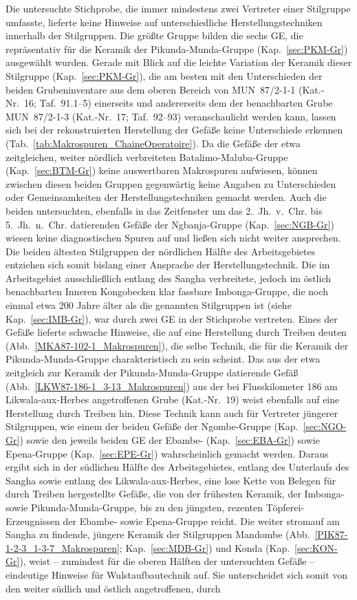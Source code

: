 Die untersuchte Stichprobe, die immer mindestens zwei Vertreter einer Stilgruppe umfasste, lieferte keine Hinweise auf unterschiedliche Herstellungstechniken innerhalb der Stilgruppen. Die größte Gruppe bilden die sechs GE, die repräsentativ für die Keramik der Pikunda-Munda-Gruppe (Kap.~\ref{sec:PKM-Gr}) ausgewählt wurden. Gerade mit Blick auf die leichte Variation der Keramik dieser Stilgruppe (Kap.~\ref{sec:PKM-Gr}), die am besten mit den Unterschieden der beiden Grubeninventare aus dem oberen Bereich von MUN~87/2-1-1 (Kat.-Nr.~16; Taf.~91.1--5) einerseits und andererseits dem der benachbarten Grube MUN~87/2-1-3 (Kat.-Nr.~17; Taf.~92--93) veranschaulicht werden kann, lassen sich bei der rekonstruierten Herstellung der Gefäße keine Unterschiede erkennen (Tab.~\ref{tab:Makrospuren_ChaineOperatoire}). Da die Gefäße der etwa zeitgleichen, weiter nördlich verbreiteten Batalimo-Maluba-Gruppe (Kap.~\ref{sec:BTM-Gr}) keine auswertbaren Makrospuren aufwiesen, können zwischen diesen beiden Gruppen gegenwärtig keine Angaben zu Unterschieden oder Gemeinsamkeiten der Herstellungstechniken gemacht werden. Auch die beiden untersuchten, ebenfalls in das Zeitfenster um das 2.~Jh.~v.~Chr. bis 5.~Jh.~n.~Chr. datierenden Gefäße der Ngbanja-Gruppe (Kap.~\ref{sec:NGB-Gr}) wiesen keine diagnostischen Spuren auf und ließen sich nicht weiter ansprechen. Die beiden ältesten Stilgruppen der nördlichen Hälfte des Arbeitsgebietes entziehen sich somit bislang einer Ansprache der Herstellungstechnik. Die im Arbeitsgebiet ausschließlich entlang des Sangha verbreitete, jedoch im östlich benachbarten Inneren Kongobecken \parencite{Wotzka.1995} klar fassbare Imbonga-Gruppe, die noch einmal etwa 200 Jahre älter als die genannten Stilgruppen ist (siehe Kap.~\ref{sec:IMB-Gr}), war durch zwei GE in der Stichprobe vertreten. Eines der Gefäße lieferte schwache Hinweise, die auf eine Herstellung durch Treiben deuten (Abb.~\ref{MKA87-102-1_Makrospuren}), die selbe Technik, die für die Keramik der Pikunda-Munda-Gruppe charakteristisch zu sein scheint. Das aus der etwa zeitgleich zur Keramik der Pikunda-Munda-Gruppe datierende Gefäß (Abb.~\ref{LKW87-186-1_3-13_Makrospuren}) aus der bei Flusskilometer 186 am Likwala-aux-Herbes angetroffenen Grube (Kat.-Nr.~19) weist ebenfalls auf eine Herstellung durch Treiben hin. Diese Technik kann auch für Vertreter jüngerer Stilgruppen, wie einem der beiden Gefäße der Ngombe-Gruppe (Kap.~\ref{sec:NGO-Gr}) sowie den jeweils beiden GE der Ebambe- (Kap.~\ref{sec:EBA-Gr}) sowie Epena-Gruppe (Kap.~\ref{sec:EPE-Gr}) wahrscheinlich gemacht werden. Daraus ergibt sich in der südlichen Hälfte des Arbeitsgebietes, entlang des Unterlaufs des Sangha sowie entlang des Likwala-aux-Herbes, eine lose Kette von Belegen für durch Treiben hergestellte Gefäße, die von der frühesten Keramik, der Imbonga- sowie Pikunda-Munda-Gruppe, bis zu den jüngsten, rezenten Töpferei-Erzeugnissen der Ebambe- sowie Epena-Gruppe reicht. Die weiter stromauf am Sangha zu findende, jüngere Keramik der Stilgruppen Mandombe (Abb.~\ref{PIK87-1-2-3_1-3-7_Makrospuren}; Kap.~\ref{sec:MDB-Gr}) und Konda (Kap.~\ref{sec:KON-Gr}), weist -- zumindest für die oberen Hälften der untersuchten Gefäße -- eindeutige Hinweise für Wulstaufbautechnik auf. Sie unterscheidet sich somit von den weiter südlich und östlich angetroffenen, durch 